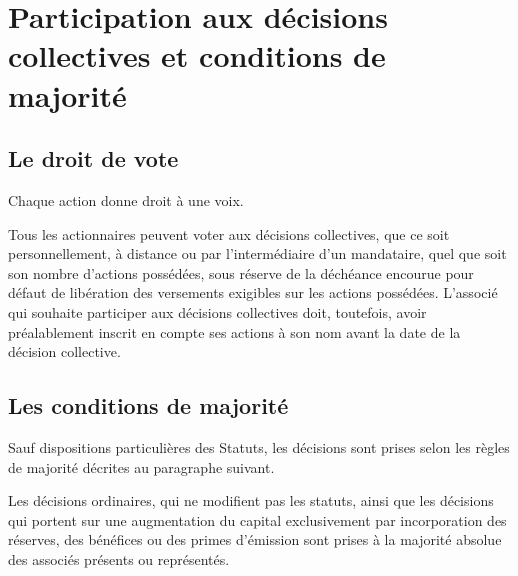 \documentclass[a4paper,12pt]{report}
\begin{document}
%

\section{Participation aux décisions collectives et conditions de majorité}
\subsection{Le droit de vote}
Chaque action donne droit à une voix.

Tous les actionnaires peuvent voter aux décisions collectives, que ce soit personnellement, à distance ou par l'intermédiaire d'un mandataire, quel que soit son nombre d'actions possédées, sous réserve de la déchéance encourue pour défaut de libération des versements exigibles sur les actions possédées. L'associé qui souhaite participer aux décisions collectives doit, toutefois, avoir préalablement inscrit en compte ses actions à son nom avant la date de la décision collective.

\subsection{Les conditions de majorité}
Sauf dispositions particulières des Statuts, les décisions sont prises selon les règles de majorité décrites au paragraphe suivant.

Les décisions ordinaires, qui ne modifient pas les statuts, ainsi que les décisions qui portent sur une augmentation du capital exclusivement par incorporation des réserves, des bénéfices ou des primes d'émission sont prises à la majorité absolue des associés présents ou représentés.
\end{document}
